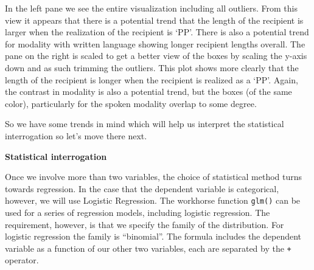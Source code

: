 \documentclass[
]{article}
\begin{document}
In the left pane we see the entire visualization including all outliers. From this view it appears that there is a potential trend that the length of the recipient is larger when the realization of the recipient is `PP'. There is also a potential trend for modality with written language showing longer recipient lengths overall. The pane on the right is scaled to get a better view of the boxes by scaling the y-axis down and as such trimming the outliers. This plot shows more clearly that the length of the recipient is longer when the recipient is realized as a `PP'. Again, the contrast in modality is also a potential trend, but the boxes (of the same color), particularly for the spoken modality overlap to some degree.

So we have some trends in mind which will help us interpret the statistical interrogation so let's move there next.

\textbf{Statistical interrogation}

Once we involve more than two variables, the choice of statistical method turns towards regression. In the case that the dependent variable is categorical, however, we will use Logistic Regression. The workhorse function \texttt{glm()} can be used for a series of regression models, including logistic regression. The requirement, however, is that we specify the family of the distribution. For logistic regression the family is ``binomial''. The formula includes the dependent variable as a function of our other two variables, each are separated by the \texttt{+} operator.
\end{document}
